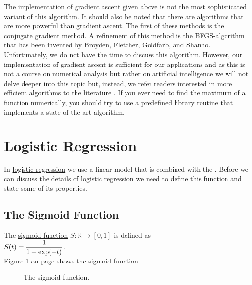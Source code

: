 The implementation of gradient ascent given above is not the most sophisticated variant of this algorithm.
It should also be noted that there are algorithms that are more powerful than
gradient ascent.  The first of these methods is the
\href{https://en.wikipedia.org/wiki/Conjugate_gradient_method}{conjugate gradient method}.  A
refinement of this method is the
\href{https://en.wikipedia.org/wiki/Broyden-Fletcher-Goldfarb-Shanno_algorithm}{BFGS-algorithm} that
has been invented by Broyden, Fletcher, Goldfarb, and Shanno.  Unfortunately, we do not have the
time to discuss this algorithm.
However, our implementation of gradient ascent is sufficient for our applications and as this is not a course on numerical
analysis but rather on artificial intelligence we will not delve deeper into this topic but, instead, we refer
readers interested in more efficient algorithms to the literature \cite{snyman:2005}.  If you ever need to find
the maximum of a function numerically, you should try to use a predefined library routine that implements a
state of the art algorithm.


\section{Logistic Regression}
In \href{https://en.wikipedia.org/wiki/Logistic_regression}{logistic regression} we use a linear model that is combined
with the .  Before we can discuss the details of logistic regression we need to
define this function and state some of its properties. 

\subsection{The Sigmoid Function}
\begin{Definition}
The \href{https://en.wikipedia.org/wiki/Sigmoid_function}{sigmoid function} $S: \mathbb{R} \rightarrow [0, 1]$ is defined as 
\\[0.2cm]
\hspace*{1.3cm}
$\displaystyle S(t) = \frac{1}{1 + \exp(-t)}$.  
\\[0.2cm]
Figure \ref{fig:sigmoid.eps} on page \pageref{fig:sigmoid.eps} shows the sigmoid function.
\eox
\end{Definition}

\begin{figure}[!ht]
\centering
{}
\vspace*{-0.3cm}
\caption{The sigmoid function.}
\label{fig:sigmoid.eps}
\end{figure}


